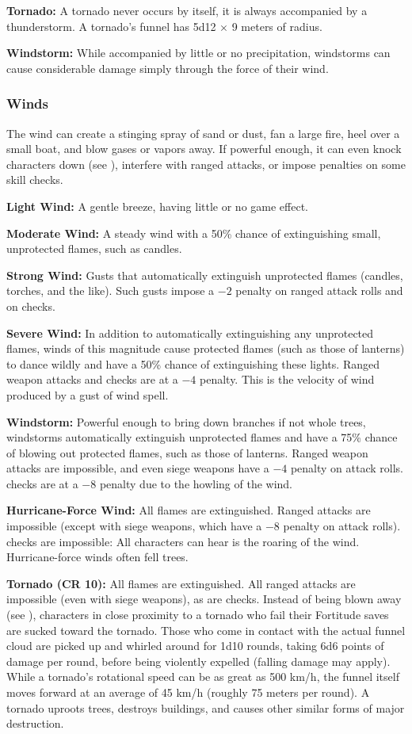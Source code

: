 \textbf{Tornado:} A tornado never occurs by itself, it is always accompanied by a thunderstorm. A tornado's funnel has 5d12 $\times$ 9 meters of radius.

\textbf{Windstorm:} While accompanied by little or no precipitation, windstorms can cause considerable damage simply through the force of their wind.

\subsubsection{Winds}
The wind can create a stinging spray of sand or dust, fan a large fire, heel over a small boat, and blow gases or vapors away. If powerful enough, it can even knock characters down (see ), interfere with ranged attacks, or impose penalties on some skill checks.

\textbf{Light Wind:} A gentle breeze, having little or no game effect.

\textbf{Moderate Wind:} A steady wind with a 50\% chance of extinguishing small, unprotected flames, such as candles.

\textbf{Strong Wind:} Gusts that automatically extinguish unprotected flames (candles, torches, and the like). Such gusts impose a $-2$ penalty on ranged attack rolls and on  checks.

\textbf{Severe Wind:} In addition to automatically extinguishing any unprotected flames, winds of this magnitude cause protected flames (such as those of lanterns) to dance wildly and have a 50\% chance of extinguishing these lights. Ranged weapon attacks and  checks are at a $-4$ penalty. This is the velocity of wind produced by a gust of wind spell.

\textbf{Windstorm:} Powerful enough to bring down branches if not whole trees, windstorms automatically extinguish unprotected flames and have a 75\% chance of blowing out protected flames, such as those of lanterns. Ranged weapon attacks are impossible, and even siege weapons have a $-4$ penalty on attack rolls.  checks are at a $-8$ penalty due to the howling of the wind.

\textbf{Hurricane-Force Wind:} All flames are extinguished. Ranged attacks are impossible (except with siege weapons, which have a $-8$ penalty on attack rolls).  checks are impossible: All characters can hear is the roaring of the wind. Hurricane-force winds often fell trees.

\textbf{Tornado (CR 10):} All flames are extinguished. All ranged attacks are impossible (even with siege weapons), as are  checks. Instead of being blown away (see ), characters in close proximity to a tornado who fail their Fortitude saves are sucked toward the tornado. Those who come in contact with the actual funnel cloud are picked up and whirled around for 1d10 rounds, taking 6d6 points of damage per round, before being violently expelled (falling damage may apply). While a tornado's rotational speed can be as great as 500 km/h, the funnel itself moves forward at an average of 45 km/h (roughly 75 meters per round). A tornado uproots trees, destroys buildings, and causes other similar forms of major destruction.